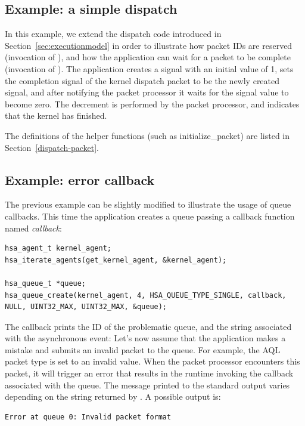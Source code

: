 \documentclass[final,oneside]{book}
\begin{document}
\subsection{Example: a simple dispatch}
In this example, we extend the dispatch code introduced in
Section~\ref{sec:executionmodel} in order to illustrate how packet IDs are
reserved (invocation of ), and how the
application can wait for a packet to be complete (invocation of
). The application creates a signal with an
initial value of 1, sets the completion signal of the kernel dispatch packet to
be the newly created signal, and after notifying the packet processor it waits
for the signal value to become zero. The decrement is performed by the packet
processor, and indicates that the kernel has finished.


The definitions of the helper functions (such as initialize_packet) are listed
in Section~\ref{dispatch-packet}.

\subsection{Example: error callback}
The previous example can be slightly modified to illustrate the usage of queue
callbacks. This time the application creates a queue passing a callback function
named \emph{callback}:
\begin{lstlisting}
hsa_agent_t kernel_agent;
hsa_iterate_agents(get_kernel_agent, &kernel_agent);

hsa_queue_t *queue;
hsa_queue_create(kernel_agent, 4, HSA_QUEUE_TYPE_SINGLE, callback, NULL, UINT32_MAX, UINT32_MAX, &queue);
\end{lstlisting}

The callback prints the ID of the problematic queue, and the string associated
with the asynchronous event:
Let's now assume that the application makes a mistake and submits an invalid
packet to the queue. For example, the AQL packet type is set to an invalid
value. When the packet processor encounters this packet, it will trigger an
error that results in the runtime invoking the callback associated with the
queue. The message printed to the standard output varies depending on the string
returned by . A possible output is:
\begin{lstlisting}
Error at queue 0: Invalid packet format
\end{lstlisting}
\end{document}
